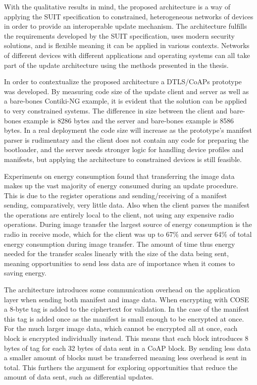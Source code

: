 \documentclass[0-thesis.tex]{subfiles}
\begin{document}
With the qualitative results in mind, the proposed architecture is a way of applying the
SUIT specification to constrained, heterogeneous networks of devices in order to provide
an interoperable update mechanism. The architecture fulfills the requirements developed by
the SUIT specification, uses modern security solutions, and is flexible meaning it can be
applied in various contexts. Networks of different devices with different applications and
operating systems can all take part of the update architecture using the methods presented
in the thesis.

In order to contextualize the proposed architecture a DTLS/CoAPs prototype was developed.
By measuring code size of the update client and server as well as a bare-bones Contiki-NG
example, it is evident that the solution can be applied to very constrained systems. The
difference in size between the client and bare-bones example is 8286 bytes and the server
and bare-bones example is 8586 bytes. In a real deployment the code size will increase as
the prototype's manifest parser is rudimentary and the client does not contain any code
for preparing the bootloader, and the server needs stronger logic for handling device
profiles and manifests, but applying the architecture to constrained devices is still
feasible.

Experiments on energy consumption found that transferring the image data makes up the vast
majority of energy consumed during an update procedure. This is due to the register
operations and sending/receiving of a manifest sending, comparatively, very little data.
Also when the client parses the manifest the operations are entirely local to the client,
not using any expensive radio operations. During image transfer the largest source of
energy consumption is the radio in receive mode, which for the client was up to 67\% and
server 64\% of total energy consumption during image transfer. The amount of time thus energy needed for the transfer scales linearly with
the size of the data being sent, meaning opportunities to send less data are of importance
when it comes to saving energy.

The architecture introduces some communication overhead on the application layer when
sending both manifest and image data. When encrypting with COSE a 8-byte tag is added to
the ciphertext for validation. In the case of the manifest this tag is added once as the
manifest is small enough to be encrypted at once. For the much larger image data, which
cannot be encrypted all at once, each block is encrypted individually instead. This means
that each block introduces 8 bytes of tag for each 32 bytes of data sent in a CoAP block.
By sending less data a smaller amount of blocks must be transferred meaning less overhead
is sent in total. This furthers the argument for exploring opportunities that reduce the
amount of data sent, such as differential updates.
\end{document}
